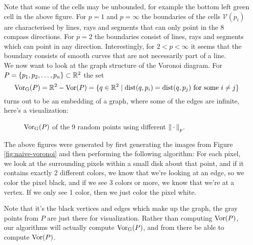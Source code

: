 Note that some of the cells may be unbounded, for example the bottom left green cell in the above figure. For $p = 1$ and $p = \infty$ the boundaries of the cells $\mathcal{V}(p_i)$ are characterised by lines, rays and segments that can only point in the 8 compass directions. For $p = 2$ the boundaries consist of lines, rays and segments which can point in any direction. Interestingly, for $2 < p < \infty$ it seems that the boundary consists of smooth curves that are not necessarily part of a line. \\

We now want to look at the graph structure of the Voronoi diagram. For $P = \{p_1, p_2, \ldots, p_n\} \subset \mathbb{R}^2$ the set
\[
    \operatorname{Vor_{G}}(P) = \mathbb{R}^2 - \operatorname{Vor}(P)
    = \{q \in \mathbb{R}^2 \mid \operatorname{dist}(q, p_i) = \operatorname{dist}(q, p_j) \text{ for some } i \ne j\}
\]
turns out to be an embedding of a graph, where some of the edges are infinite, here's a visualization:
\begin{figure}[H]
    \centering
    \hspace{0mm}
    \caption{$\operatorname{Vor_{G}}(P)$ of the 9 random points using different $\left\lVert \,\cdot\, \right\rVert_p$.}
\end{figure}
The above figures were generated by first generating the images from Figure \ref{fig:naive-voronoi} and then performing the following algorithm: For each pixel, we look at the surrounding pixels within a small disk about that point, and if it contains exactly 2 different colors, we know that we're looking at an edge, so we color the pixel black, and if we see 3 colors or more, we know that we're at a vertex. If we only see 1 color, then we just color the pixel white.

Note that it's the black vertices and edges which make up the graph, the gray points from $P$ are just there for visualization. Rather than computing $\operatorname{Vor}(P)$, our algorithms will actually compute $\operatorname{Vor_{G}}(P)$, and from there be able to compute $\operatorname{Vor}(P)$. \\

